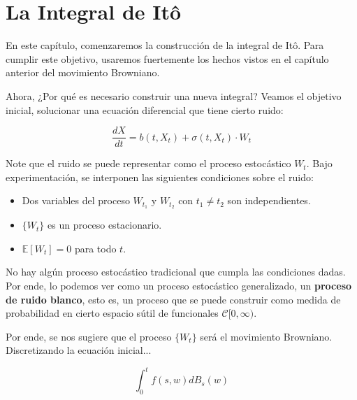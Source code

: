 \chapter{La Integral de Itô}

En este capítulo, comenzaremos la construcción de la integral de Itô. Para cumplir este objetivo, usaremos fuertemente los hechos vistos en el capítulo anterior del movimiento Browniano. 

Ahora, ¿Por qué es necesario construir una nueva integral? Veamos el objetivo inicial, solucionar una ecuación diferencial que tiene cierto ruido:

\[
	\frac{dX}{dt} = b(t, X_t) + \sigma (t, X_t) \cdot W_t
\]

Note que el ruido se puede representar como el proceso estocástico $W_t$. Bajo experimentación, se interponen las siguientes condiciones sobre el ruido:

\begin{itemize}
	\item Dos variables del proceso $W_{t_1}$ y $W_{t_2}$ con $t_1 \neq t_2$ son independientes.
	\item $\{ W_t \}$ es un proceso estacionario.
	\item $\mathbb{E}[W_t] = 0$ para todo $t$.
\end{itemize} 

No hay algún proceso estocástico tradicional que cumpla las condiciones dadas. Por ende, lo podemos ver como un proceso estocástico generalizado, un \textbf{proceso de ruido blanco}, esto es, un proceso que se puede construir como medida de probabilidad en cierto espacio sútil de funcionales $\mathcal{C}[ 0, \infty )$. 

Por ende, se nos sugiere que el proceso $\{W_t\}$ será el movimiento Browniano. Discretizando la ecuación inicial...

\[
	\int_0^t f(s,w) dB_s(w)
\]

